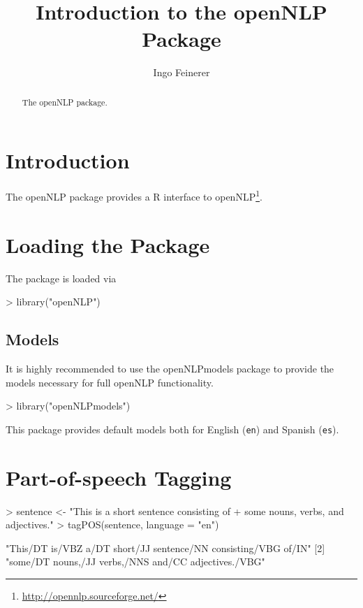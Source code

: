 \documentclass[a4paper]{article}
\newcommand{\strong}[1]{{\normalfont\fontseries{b}\selectfont #1}}
\newcommand{\code}[1]{\mbox{\texttt{#1}}}
\newcommand{\pkg}[1]{\strong{#1}}
\newcommand{\proglang}[1]{\textsf{#1}}
\begin{document}
\title{Introduction to the \pkg{openNLP} Package}
\author{Ingo Feinerer}
\maketitle
\sloppy

\begin{abstract}
  The \pkg{openNLP} package.
\end{abstract}

\section*{Introduction}
The \pkg{openNLP} package provides a \proglang{R} interface to
\proglang{openNLP}\footnote{\url{http://opennlp.sourceforge.net/}}.

\section*{Loading the Package}
The package is loaded via
\begin{Schunk}
\begin{Sinput}
> library("openNLP")
\end{Sinput}
\end{Schunk}

\subsection*{Models}
It is highly recommended to use the \pkg{openNLPmodels} package to
provide the models necessary for full \pkg{openNLP} functionality.
\begin{Schunk}
\begin{Sinput}
> library("openNLPmodels")
\end{Sinput}
\end{Schunk}
This package provides default models both for English (\code{en}) and
Spanish (\code{es}).

\section*{Part-of-speech Tagging}
\begin{Schunk}
\begin{Sinput}
> sentence <- "This is a short sentence consisting of
+              some nouns, verbs, and adjectives."
> tagPOS(sentence, language = "en")
\end{Sinput}
\end{Schunk}
\begin{Schunk}
\begin{Soutput}
[1] "This/DT is/VBZ a/DT short/JJ sentence/NN consisting/VBG of/IN"
[2] "some/DT nouns,/JJ verbs,/NNS and/CC adjectives./VBG"          
\end{Soutput}
\end{Schunk}
\end{document}
